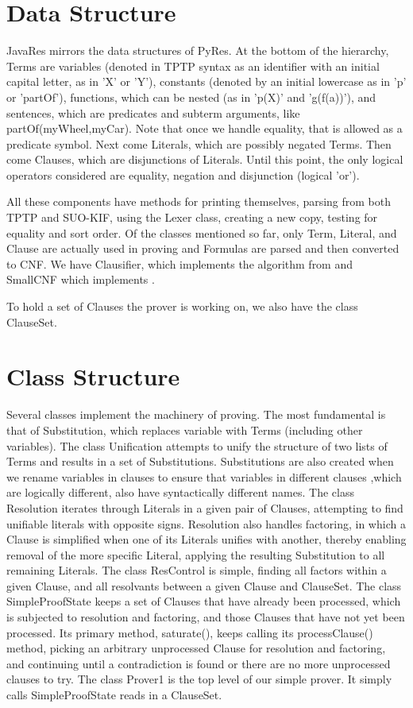\documentclass{llncs}
\begin{document}
\section{Data Structure}

JavaRes mirrors the data structures of PyRes.  At the bottom of the hierarchy, Terms
are variables (denoted in TPTP syntax as an identifier with an initial capital letter,
as in 'X' or 'Y'), constants (denoted by an initial lowercase as in 'p' or 'partOf'),
functions, which can be nested (as in 'p(X)' and 'g(f(a))'), and sentences, which are predicates and
subterm arguments, like partOf(myWheel,myCar).  Note that once we handle equality, that
is allowed as a predicate symbol.  Next come Literals,
which are possibly negated Terms.  Then come Clauses, which are disjunctions of Literals.
Until this point, the only logical operators considered are equality, negation and disjunction (logical 'or').

All these components have methods for printing themselves, parsing from both TPTP and
SUO-KIF, using the Lexer class, creating a new copy, testing for equality and sort order. Of the
classes mentioned so far, only Term, Literal, and Clause are actually used in proving and Formulas
are parsed and then converted to CNF.  We have Clausifier, which implements the algorithm from
\cite{RN:AI-95} and SmallCNF which implements \cite{NW:SmallCNF-2001}.

To hold a set of Clauses the prover is working on, we also have the class ClauseSet.

\section{Class Structure}

Several classes implement the machinery of proving.  The most fundamental is that of Substitution,
which replaces variable with Terms (including other variables).   The class Unification attempts to
unify the structure of two lists of Terms and results in a set of Substitutions.  Substitutions are
also created when we rename variables in clauses to ensure that variables in different clauses
,which are logically different, also have syntactically different names.  The class Resolution
iterates through Literals in a given pair of Clauses, attempting to find unifiable literals with
opposite signs.  Resolution also handles factoring, in which a Clause is simplified when one of
its Literals unifies with another, thereby enabling removal of the more specific Literal, applying
the resulting Substitution to all remaining Literals.  The class ResControl is simple, finding
all factors within a given Clause, and all resolvants between a given Clause and ClauseSet.  The class
SimpleProofState keeps a set of Clauses that
have already been processed, which is subjected to resolution and factoring, and those Clauses that
have not yet been processed.  Its primary method, saturate(), keeps calling its processClause()
method, picking an arbitrary unprocessed Clause for resolution and factoring, and continuing until
a contradiction is found or there are no more unprocessed clauses to try.  The class Prover1 is
the top level of our simple prover.  It simply calls SimpleProofState reads in a ClauseSet.
\end{document}
